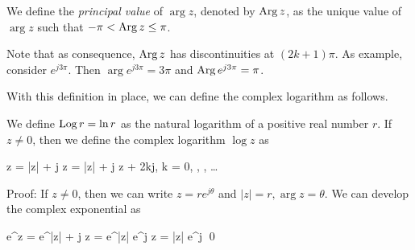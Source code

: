 \begin{definition}
    We define the \emph{principal value} of $\arg z$, denoted by $\operatorname{Arg} z$, as the unique value of $\arg z$ such that $- \pi < \operatorname{Arg} z \leq \pi$.
\end{definition}

Note that as consequence, $\operatorname{Arg} z$ has discontinuities at $(2k+1) \pi$. As example, consider $e^{j 3 \pi}$. Then $\arg e^{j 3 \pi} = 3 \pi$ and $\operatorname{Arg} e^{j 3 \pi} = \pi$. 

With this definition in place, we can define the complex logarithm as follows.

\begin{definition}
    We define $\operatorname{Log} r = \ln r$ as the natural logarithm of a positive real number $r$. If $z \neq 0$, then we define the complex logarithm $\log z$ as

    \bee
        \log z = \Log |z| + j \arg z = \Log |z| + j \Arg z + 2kj\pi, \quad k = 0, , , \ldots
    \eee
\end{definition}

Proof: If $z \neq 0$, then we can write $z = r e^{j \theta}$ and $|z| = r, \arg z = \theta$. We can develop the complex exponential as

\bee
e^{\log z} = e^{\Log |z| + j \arg z} = e^{\Log |z|} e^{j \arg z} = |z| e^{j \theta} \qed
\eee




